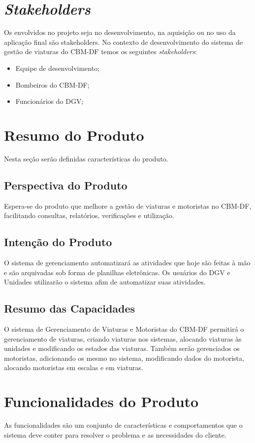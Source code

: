 	\section{\textit{Stakeholders}}
Os envolvidos no projeto seja no desenvolvimento, na aquisição ou no uso da aplicação final são stakeholders. No contexto de desenvolvimento do sistema de gestão de viaturas do CBM-DF temos os seguintes \textit{stakeholders}:
\begin{itemize}
 \item Equipe de desenvolvimento;
 \item Bombeiros do CBM-DF;
 \item Funcionários do DGV;
\end{itemize}
	\section{Resumo do Produto}
Nesta seção serão definidas características do produto.
		\subsection{Perspectiva do Produto}
Espera-se do produto que melhore a gestão de viaturas e motoristas no CBM-DF, facilitando consultas, relatórios, verificações e utilização.
		\subsection{Intenção do Produto}
O sistema de gerenciamento automatizará as atividades que hoje são feitas à mão e são arquivadas sob forma de planilhas eletrônicas. Os usuários do DGV e Unidades utilizarão o sistema afim de automatizar suas atividades.
		\subsection{Resumo das Capacidades}
O sistema de Gerenciamento de Viaturas e Motoristas do CBM-DF permitirá o gerenciamento de viaturas, criando viaturas nos sistemas, alocando viaturas às unidades e modificando os estados das viaturas. Também serão gerenciados os motoristas, adicionando os mesmo no sistema, modificando dados do motorista, alocando motoristas em escalas e em viaturas.
	\section{Funcionalidades do Produto}
As funcionalidades são um conjunto de características e comportamentos que o sistema deve conter para resolver o problema e as necessidades do cliente.
